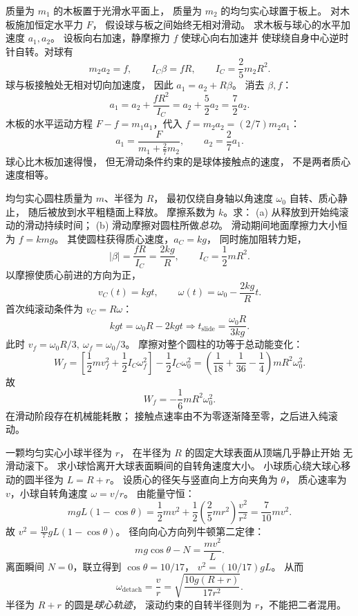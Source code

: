 
质量为 $m_1$ 的木板置于光滑水平面上，
质量为 $m_2$ 的均匀实心球置于板上。
对木板施加恒定水平力 $F$，
假设球与板之间始终无相对滑动。
求木板与球心的水平加速度 $a_1,a_2$。
\exsolution
设板向右加速，静摩擦力 $f$ 使球心向右加速并
使球绕自身中心逆时针自转。对球有
\[
m_2a_2=f,\qquad I_C\beta=fR,\qquad
I_C=\frac25m_2R^2.
\]
球与板接触处无相对切向加速度，
因此
$a_1=a_2+R\beta$。
消去 $\beta,f$：
\[
a_1=a_2+\frac{fR^2}{I_C}
=a_2+\frac52a_2=\frac72a_2.
\]
木板的水平运动方程
$F-f=m_1a_1$，代入 $f=m_2a_2=(2/7)m_2a_1$：
\[
\boxed{a_1=\frac{F}{m_1+\frac27m_2}},\qquad
\boxed{a_2=\frac27a_1}.
\]
\excheck 球心比木板加速得慢，
但无滑动条件约束的是球体接触点的速度，
不是两者质心速度相等。

均匀实心圆柱质量为 $m$、半径为 $R$，
最初仅绕自身轴以角速度 $\omega_0$ 自转、质心静止，
随后被放到水平粗糙面上释放。
摩擦系数为 $k$。求：
(a) 从释放到开始纯滚动的滑动持续时间；
(b) 滑动摩擦对圆柱所做\emph{总功}。
\exsolution
滑动期间地面摩擦力大小恒为 $f=kmg$。
其使圆柱获得质心速度，$a_C=kg$，
同时施加阻转力矩，
\[
|\beta|=\frac{fR}{I_C}=\frac{2kg}{R},
\qquad I_C=\frac12mR^2.
\]
以摩擦使质心前进的方向为正，
\[
v_C(t)=kgt,\qquad
\omega(t)=\omega_0-\frac{2kg}{R}t.
\]
首次纯滚动条件为 $v_C=R\omega$：
\[
kgt=\omega_0R-2kgt
\Longrightarrow
\boxed{t_{\mathrm{slide}}=\frac{\omega_0R}{3kg}}.
\]
此时 $v_f=\omega_0R/3,\ \omega_f=\omega_0/3$。
摩擦对整个圆柱的功等于总动能变化：
\[
W_f=\left[\frac12mv_f^2+\frac12I_C\omega_f^2\right]
-\frac12I_C\omega_0^2
=\left(\frac1{18}+\frac1{36}-\frac14\right)
mR^2\omega_0^2.
\]
故
\[
\boxed{W_f=-\frac16mR^2\omega_0^2}.
\]
\excheck 在滑动阶段存在机械能耗散；
接触点速率由不为零逐渐降至零，之后进入纯滚动。

一颗均匀实心小球半径为 $r$，
在半径为 $R$ 的固定大球表面从顶端几乎静止开始
无滑动滚下。
求小球恰离开大球表面瞬间的自转角速度大小。
\exsolution
小球质心绕大球心移动的圆半径为 $L=R+r$。
设质心的径矢与竖直向上方向夹角为 $\theta$，
质心速率为 $v$，小球自转角速度
$\omega=v/r$。
由能量守恒：
\[
mgL(1-\cos\theta)
=\frac12mv^2+\frac12\left(\frac25mr^2\right)\frac{v^2}{r^2}
=\frac7{10}mv^2.
\]
故
$v^2=\frac{10}{7}gL(1-\cos\theta)$。
径向向心方向列牛顿第二定律：
\[
mg\cos\theta-N=\frac{mv^2}{L}.
\]
离面瞬间 $N=0$，联立得到
$\cos\theta=10/17$，
$v^2=(10/17)gL$。
从而
\[
\boxed{\omega_{\mathrm{detach}}=
\frac vr=\sqrt{\frac{10g(R+r)}{17r^2}}}.
\]
\excheck 半径为 $R+r$ 的圆是\emph{球心轨迹}，
滚动约束的自转半径则为 $r$，不能把二者混用。

